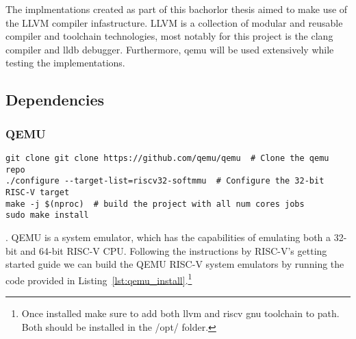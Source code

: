 The implmentations created as part of this bachorlor thesis aimed
to make use of the LLVM compiler infastructure.
LLVM is a collection of modular and reusable compiler and toolchain technologies,
most notably for this project is the clang compiler and
lldb debugger. Furthermore, qemu will be used extensively while testing the
implementations.

\subsection{Dependencies}
\subsubsection{QEMU}
\begin{lstlisting}[caption=Installing QEMU, float=*, label=lst:qemu_install]
git clone git clone https://github.com/qemu/qemu  # Clone the qemu repo
./configure --target-list=riscv32-softmmu  # Configure the 32-bit RISC-V target
make -j $(nproc)  # build the project with all num cores jobs
sudo make install
\end{lstlisting}.
QEMU is a system emulator, which has the capabilities of emulating both a 32-bit
and 64-bit RISC-V CPU\cite{QEMU}.
Following the instructions by RISC-V's getting started guide
we can build the QEMU RISC-V system emulators by running the code
provided in Listing~\ref{lst:qemu_install}\cite{RISC-V_GS}.\footnote{Once
installed make sure to add both llvm and riscv gnu toolchain
to path. Both should be installed in the /opt/ folder.}

